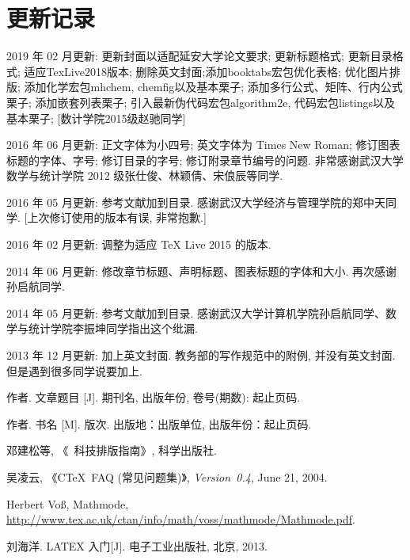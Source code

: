 \documentclass[forprint]{YAUthesis}
\begin{document}
\chapter{更新记录}
2019 年 02 月更新: 更新封面以适配延安大学论文要求; 更新标题格式; 更新目录格式; 
适应TexLive2018版本; 删除英文封面;添加booktabs宏包优化表格; 优化图片排版; 
添加化学宏包mhchem, chemfig以及基本栗子; 
添加多行公式、矩阵、行内公式栗子; 添加嵌套列表栗子; 
引入最新伪代码宏包algorithm2e, 代码宏包listings以及基本栗子;
[数计学院2015级赵驰同学]

2016 年 06 月更新: 正文字体为小四号; 英文字体为 Times New Roman; 修订图表标题的字体、字号; 修订目录的字号; 修订附录章节编号的问题. 
                          非常感谢武汉大学数学与统计学院 2012 级张仕俊、林颖倩、宋俍辰等同学. 

2016 年 05 月更新: 参考文献加到目录. 感谢武汉大学经济与管理学院的郑中天同学. [上次修订使用的版本有误, 非常抱歉.]

2016 年 02 月更新: 调整为适应 TeX Live 2015 的版本.

2014 年 06 月更新: 修改章节标题、声明标题、图表标题的字体和大小. 再次感谢孙启航同学.

2014 年 05 月更新: 参考文献加到目录. 感谢武汉大学计算机学院孙启航同学、数学与统计学院李振坤同学指出这个纰漏.

2013 年 12 月更新: 加上英文封面. 教务部的写作规范中的附例, 并没有英文封面. 但是遇到很多同学说要加上.





\cleardoublepage{}
{}
\begin{thebibliography}{00}

   作者. 文章题目 [J].  期刊名, 出版年份, 卷号(期数): 起止页码.

   作者. 书名 [M]. 版次. 出版地：出版单位, 出版年份：起止页码.

   邓建松等, 《\LaTeXe~科技排版指南》, 科学出版社.

   吴凌云, 《CTeX~FAQ (常见问题集)》, \textit{Version~0.4}, June 21, 2004.

   Herbert Vo\ss, Mathmode, \url{http://www.tex.ac.uk/ctan/info/math/voss/mathmode/Mathmode.pdf}.
  
   刘海洋. LATEX 入门[J]. 电子工业出版社, 北京, 2013.

\end{thebibliography}
\end{document}
